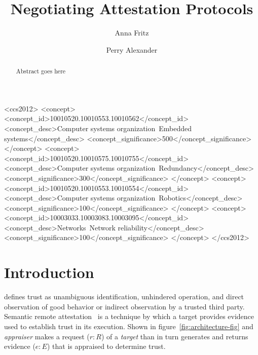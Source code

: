 \documentclass[sigconf,authordraft]{acmart}
\begin{document}
\title{Negotiating Attestation Protocols}

\author{Anna Fritz}  \author{Perry Alexander}
  

\renewcommand{\shortauthors}{Fritz and Alexander}

\begin{abstract}
  Abstract goes here
\end{abstract}

\begin{CCSXML}
  <ccs2012> <concept>
  <concept_id>10010520.10010553.10010562</concept_id>
  <concept_desc>Computer systems organization~Embedded
  systems</concept_desc>
  <concept_significance>500</concept_significance> </concept>
  <concept> <concept_id>10010520.10010575.10010755</concept_id>
  <concept_desc>Computer systems
  organization~Redundancy</concept_desc>
  <concept_significance>300</concept_significance> </concept>
  <concept> <concept_id>10010520.10010553.10010554</concept_id>
  <concept_desc>Computer systems organization~Robotics</concept_desc>
  <concept_significance>100</concept_significance> </concept>
  <concept> <concept_id>10003033.10003083.10003095</concept_id>
  <concept_desc>Networks~Network reliability</concept_desc>
  <concept_significance>100</concept_significance> </concept>
  </ccs2012>
\end{CCSXML}



\maketitle

\section{Introduction}

\citet{Martin:08:The-ten-page-in} defines trust as unambiguous
identification, unhindered operation, and direct observation of good
behavior or indirect observation by a trusted third party.  Semantic
remote attestation~\cite{Haldar:04:Semantic-Remote} is a technique by
which a target provides evidence used to establish trust in its
execution.  Shown in figure~\ref{fig:architecture-fig} and
\emph{appraiser} makes a request ($r:R$) of a \emph{target} than in
turn generates and returns evidence ($e:E$) that is appraised to
determine trust.
\end{document}
